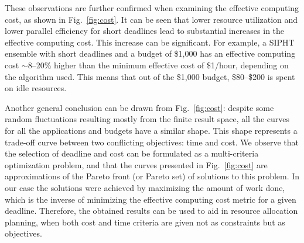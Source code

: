 \documentclass{sig-alternate}
\begin{document}
These observations are further confirmed when examining the effective computing
cost, as shown in Fig.~\ref{fig:cost}. It can be seen that lower resource
utilization and lower parallel efficiency for short deadlines lead to
substantial increases in the effective computing cost. This increase can be 
significant. For example, a SIPHT ensemble with short deadlines and a budget
of \$1,000 has an effective computing cost $\sim$8--20\% higher than the 
minimum effective cost of \$1/hour, depending on the algorithm used. This means 
that out of the \$1,000 budget, \$80--\$200 is spent on idle resources.

Another general conclusion can be drawn from Fig.~\ref{fig:cost}: despite some
random fluctuations resulting mostly from the finite result space, all the
curves for all the applications and budgets have a similar shape. This shape
represents a trade-off curve between two conflicting objectives: time and cost.
We observe that the selection of deadline and cost can be formulated as a
multi-criteria optimization problem, and that the curves presented in 
Fig.~\ref{fig:cost} are approximations of the Pareto front (or Pareto set) of
solutions to this problem. In our case the solutions were achieved by maximizing
the amount of work done, which is the inverse of minimizing the effective 
computing cost metric for a given deadline. Therefore, the obtained results 
can be used to aid in resource allocation planning, when both cost and time 
criteria are given not as constraints but as objectives.

\end{document}
